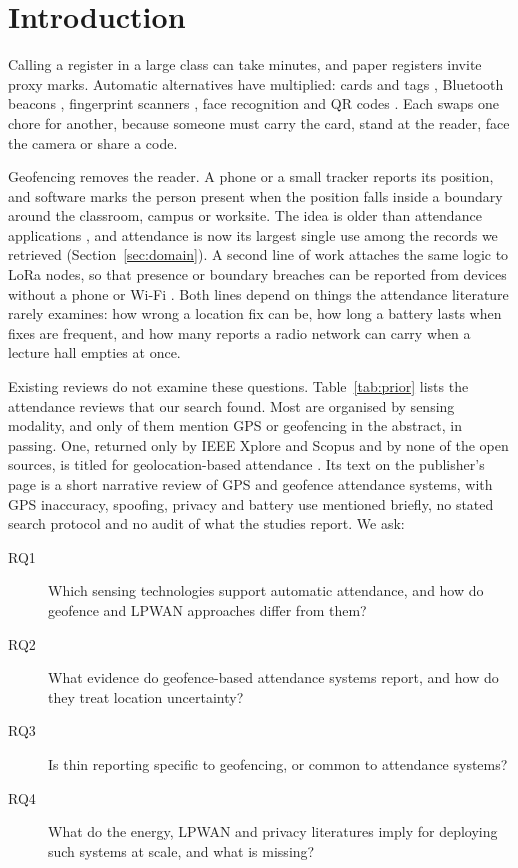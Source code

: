 \documentclass[preprint,12pt]{elsarticle}
\begin{document}
\section{Introduction}
Calling a register in a large class can take minutes, and paper registers invite proxy marks. Automatic alternatives have multiplied: cards and tags \cite{lim2009rfid,kassim2012based,koppikar2019based}, Bluetooth beacons \cite{noguchi2015student,lodha2015bluetooth}, fingerprint scanners \cite{mohamed2012fingerprint,mittal2015fingerprint}, face recognition \cite{bah2020improved,arsenovic2017facetime,alhanaee2021face} and QR codes \cite{masalha2014students}. Each swaps one chore for another, because someone must carry the card, stand at the reader, face the camera or share a code.

Geofencing removes the reader. A phone or a small tracker reports its position, and software marks the person present when the position falls inside a boundary around the classroom, campus or worksite. The idea is older than attendance applications \cite{reclus2009geofencing,rodriguezgarzon2014geofencing}, and attendance is now its largest single use among the records we retrieved (Section~\ref{sec:domain}). A second line of work attaches the same logic to LoRa nodes, so that presence or boundary breaches can be reported from devices without a phone or Wi-Fi \cite{ahmed2024scalable,j2026fencing}. Both lines depend on things the attendance literature rarely examines: how wrong a location fix can be, how long a battery lasts when fixes are frequent, and how many reports a radio network can carry when a lecture hall empties at once.

Existing reviews do not examine these questions. Table~\ref{tab:prior} lists the \nPriorSel{} attendance reviews that our search found. Most are organised by sensing modality, and only \nPriorGps{} of them mention GPS or geofencing in the abstract, in passing. One, returned only by IEEE Xplore and Scopus and by none of the open sources, is titled for geolocation-based attendance \cite{gupta2025geolocation}. Its text on the publisher's page is a short narrative review of GPS and geofence attendance systems, with GPS inaccuracy, spoofing, privacy and battery use mentioned briefly, no stated search protocol and no audit of what the studies report. We ask:
\begin{description}
\item[RQ1] Which sensing technologies support automatic attendance, and how do geofence and LPWAN approaches differ from them?
\item[RQ2] What evidence do geofence-based attendance systems report, and how do they treat location uncertainty?
\item[RQ3] Is thin reporting specific to geofencing, or common to attendance systems?
\item[RQ4] What do the energy, LPWAN and privacy literatures imply for deploying such systems at scale, and what is missing?
\end{description}
\end{document}
